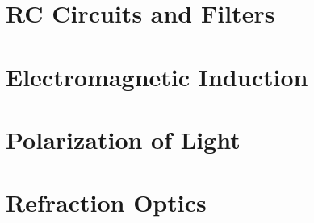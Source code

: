 \documentclass[12pt,letterpaper]{book}
\begin{document}
\chapter{RC Circuits and Filters}


\chapter{Electromagnetic Induction}


\chapter{Polarization of Light}
\label{ch:pol} %


\chapter{Refraction Optics}
\label{ch:optics}


% 

% 




    
\end{document}
